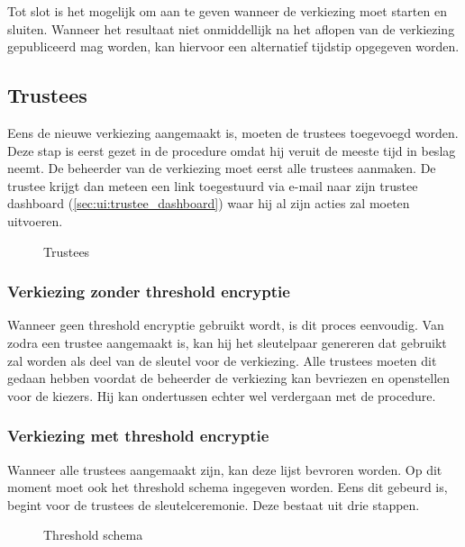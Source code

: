 \npar Tot slot is het mogelijk om aan te geven wanneer de verkiezing moet starten en sluiten. Wanneer het resultaat niet onmiddellijk na het aflopen van de verkiezing gepubliceerd mag worden, kan hiervoor een alternatief tijdstip opgegeven worden.

\subsection{Trustees}
\label{sec:proc:trustees}

Eens de nieuwe verkiezing aangemaakt is, moeten de trustees toegevoegd worden. Deze stap is eerst gezet in de procedure omdat hij veruit de meeste tijd in beslag neemt. De beheerder van de verkiezing moet eerst alle trustees aanmaken. De trustee krijgt dan meteen een link toegestuurd via e-mail naar zijn trustee dashboard (\ref{sec:ui:trustee_dashboard}) waar hij al zijn acties zal moeten uitvoeren.

\begin{figure}
  \caption{Trustees}
  \label{fig:proc:trustees_view}
\end{figure}

\subsubsection{Verkiezing zonder threshold encryptie}

Wanneer geen threshold encryptie gebruikt wordt, is dit proces eenvoudig. Van zodra een trustee aangemaakt is, kan hij het sleutelpaar genereren dat gebruikt zal worden als deel van de sleutel voor de verkiezing. Alle trustees moeten dit gedaan hebben voordat de beheerder de verkiezing kan bevriezen en openstellen voor de kiezers. Hij kan ondertussen echter wel verdergaan met de procedure.

\subsubsection{Verkiezing met threshold encryptie}

\npar Wanneer alle trustees aangemaakt zijn, kan deze lijst bevroren worden. Op dit moment moet ook het threshold schema ingegeven worden. Eens dit gebeurd is, begint voor de trustees de sleutelceremonie. Deze bestaat uit drie stappen.

\begin{figure}
  \caption{Threshold schema}
  \label{fig:proc:trustees_freeze}
\end{figure}

